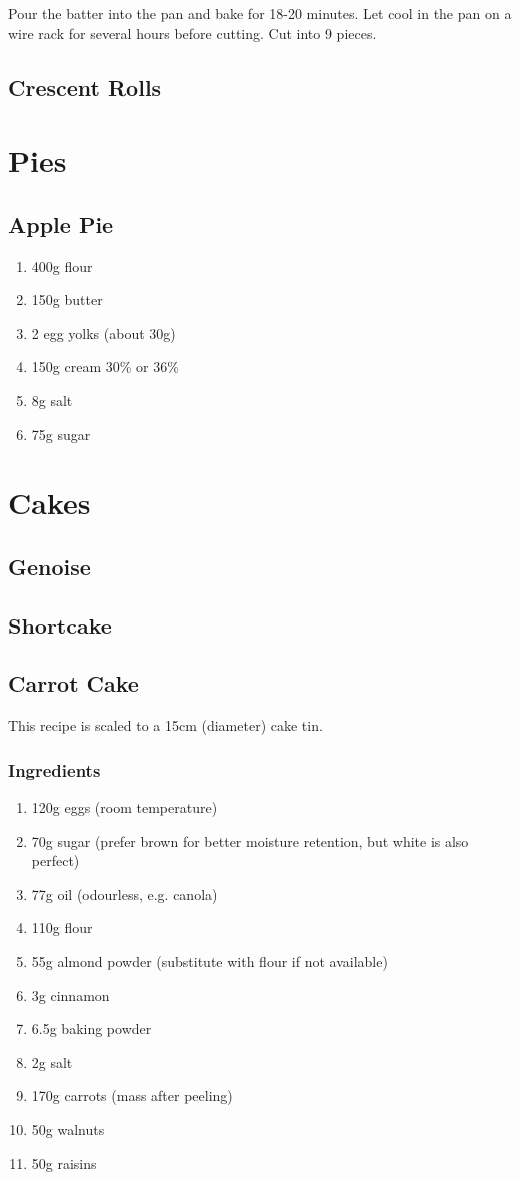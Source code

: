 \documentclass[11pt]{report}
\begin{document}
Pour the batter into the pan and bake for 18-20 minutes. Let cool in the pan on
a wire rack for several hours before cutting. Cut into 9 pieces.

\section{Crescent Rolls}

\chapter{Pies}
\section{Apple Pie}
\begin{enumerate}
  \item 400g flour
  \item 150g butter
  \item 2 egg yolks (about 30g)
  \item 150g cream 30\% or 36\%
  \item 8g salt
  \item 75g sugar
\end{enumerate}

\chapter{Cakes}
\section{Genoise}
\section{Shortcake}

\section{Carrot Cake}
This recipe is scaled to a 15cm (diameter) cake tin.

\subsection*{Ingredients}
\begin{enumerate}
  \item 120g eggs (room temperature)
  \item 70g sugar (prefer brown for better moisture retention, but white is also
  perfect)
  \item 77g oil (odourless, e.g. canola)
  \item 110g flour
  \item 55g almond powder (substitute with flour if not available)
  \item 3g cinnamon
  \item 6.5g baking powder
  \item 2g salt
  \item 170g carrots (mass after peeling)
  \item 50g walnuts
  \item 50g raisins
\end{enumerate}
\end{document}
